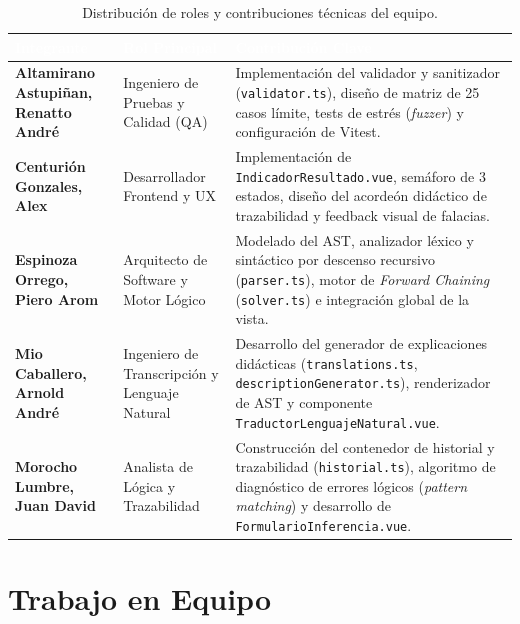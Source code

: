 \documentclass[11pt,a4paper]{article}
\begin{document}
\vspace{0.4cm}
\begin{table}[h!]
\centering
\small
\renewcommand{\arraystretch}{1.35}
\begin{tabularx}{\textwidth}{|>{\bfseries}p{4.5cm}|>{\raggedright\arraybackslash}p{3.8cm}|>{\raggedright\arraybackslash}X|}
\hline
\rowcolor{headerblue}
\textcolor{white}{Integrante} & \textcolor{white}{Rol Principal} & \textcolor{white}{Contribución Clave} \\
\hline
Altamirano Astupiñan, Renatto André & Ingeniero de Pruebas y Calidad (QA) & Implementación del validador y sanitizador (\texttt{validator.ts}), diseño de matriz de 25 casos límite, tests de estrés (\textit{fuzzer}) y configuración de Vitest. \\
\hline
Centurión Gonzales, Alex & Desarrollador Frontend y UX & Implementación de \texttt{IndicadorResultado.vue}, semáforo de 3 estados, diseño del acordeón didáctico de trazabilidad y feedback visual de falacias. \\
\hline
Espinoza Orrego, Piero Arom & Arquitecto de Software y Motor Lógico & Modelado del AST, analizador léxico y sintáctico por descenso recursivo (\texttt{parser.ts}), motor de \textit{Forward Chaining} (\texttt{solver.ts}) e integración global de la vista. \\
\hline
Mio Caballero, Arnold André & Ingeniero de Transcripción y Lenguaje Natural & Desarrollo del generador de explicaciones didácticas (\texttt{translations.ts}, \texttt{descriptionGenerator.ts}), renderizador de AST y componente \texttt{TraductorLenguajeNatural.vue}. \\
\hline
Morocho Lumbre, Juan David & Analista de Lógica y Trazabilidad & Construcción del contenedor de historial y trazabilidad (\texttt{historial.ts}), algoritmo de diagnóstico de errores lógicos (\textit{pattern matching}) y desarrollo de \texttt{FormularioInferencia.vue}. \\
\hline
\end{tabularx}
\caption{Distribución de roles y contribuciones técnicas del equipo.}
\end{table}

\section{Trabajo en Equipo}
\end{document}
